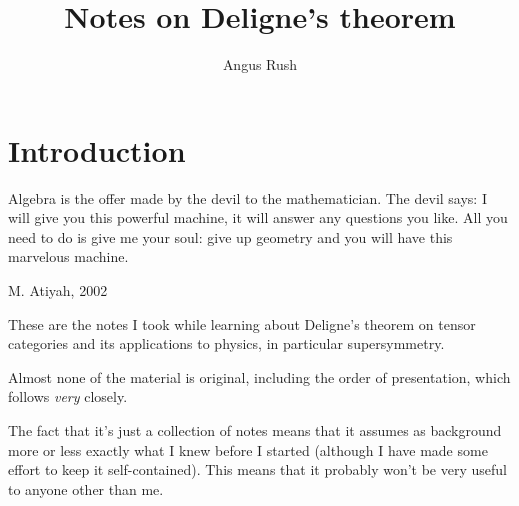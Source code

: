 \documentclass[a4paper,10pt]{scrreprt}
\title{Notes on Deligne's theorem}
\author{Angus Rush}
\theoremstyle{definition}
\theoremstyle{plain}
\theoremstyle{remark}
\begin{document}
 
\maketitle
\tableofcontents 

\chapter{Introduction}
\epigraph{Algebra is the offer made by the devil to the mathematician. The devil says: I will give you this powerful machine, it will answer any questions you like. All you need to do is give me your soul: give up geometry and you will have this marvelous machine.}{M. Atiyah, 2002}

These are the notes I took while learning about Deligne's theorem on tensor categories and its applications to physics, in particular supersymmetry. 

Almost none of the material is original, including the order of presentation, which follows \cite{nlab-deligne-theorem} \emph{very} closely.

The fact that it's just a collection of notes means that it assumes as background more or less exactly what I knew before I started (although I have made some effort to keep it self-contained). This means that it probably won't be very useful to anyone other than me.
\end{document}
